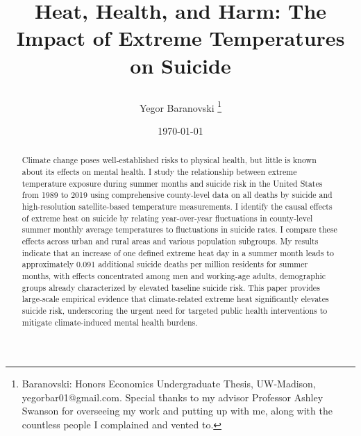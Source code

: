 \documentclass[12pt, a4paper]{article}
\begin{document}
\title{{\vspace{-2cm} \textbf{{Heat, Health, and Harm: The Impact of Extreme Temperatures on Suicide}}}

\author{\normalsize{Yegor Baranovski}
\thanks{Baranovski: 
Honors Economics Undergraduate Thesis, UW-Madison, yegorbar01@gmail.com. Special thanks to my advisor Professor Ashley Swanson for overseeing my work and putting up with me, along with the countless people I complained and vented to.}   } }

\vspace{-0.0in}
\date{\normalsize{ \vspace{0.0in} \today  \\ \vspace{0.0in} 
}
} 
\maketitle

\thispagestyle{empty}%
\vspace{-0.5cm} 

\begin{abstract}
\noindent  

Climate change poses well-established risks to physical health, but little is known about its effects on mental health.  I study the relationship between extreme temperature exposure during summer months and suicide risk in the United States from 1989 to 2019 using comprehensive county-level data on all deaths by suicide and high-resolution satellite-based temperature measurements. I identify the causal effects of extreme heat on suicide by relating year-over-year fluctuations in county-level summer monthly average temperatures to fluctuations in suicide rates. I compare these effects across urban and rural areas and various population subgroups. My results indicate that an increase of one defined extreme heat day in a summer month leads to approximately 0.091 additional suicide deaths per million residents for summer months, with effects concentrated among men and working-age adults, demographic groups already characterized by elevated baseline suicide risk. This paper provides large-scale empirical evidence that climate-related extreme heat significantly elevates suicide risk, underscoring the urgent need for targeted public health interventions to mitigate climate-induced mental health burdens.



\end{abstract} 
\newpage
\tableofcontents
\newpage
\end{document}

